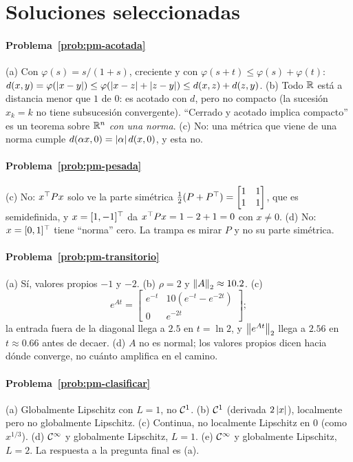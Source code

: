 \section{Soluciones seleccionadas}

\paragraph{Problema~\ref{prob:pm-acotada}}
(a) Con $\varphi(s)=s/(1+s)$, creciente y con $\varphi(s+t)\le\varphi(s)+\varphi(t)$: $d(x,y)=\varphi(\left\lvert x-y\right\rvert)\le\varphi(\left\lvert x-z\right\rvert+\left\lvert z-y\right\rvert)\le d(x,z)+d(z,y)$. (b) Todo $\mathbb{R}$ está a distancia menor que $1$ de $0$: es acotado con $d$, pero no compacto (la sucesión $x_k=k$ no tiene subsucesión convergente). ``Cerrado y acotado implica compacto'' es un teorema sobre $\mathbb{R}^n$ \emph{con una norma}. (c) No: una métrica que viene de una norma cumple $d(\alpha x,0)=\left\lvert \alpha\right\rvert d(x,0)$, y esta no.

\paragraph{Problema~\ref{prob:pm-pesada}}
(c) No: $x^{\top} Px$ solo ve la parte simétrica $\tfrac12(P+P^{\top})=\begin{bmatrix}1&1\\1&1\end{bmatrix}$, que es semidefinida, y $x=[1,-1]^{\top}$ da $x^{\top} Px=1-2+1=0$ con $x\neq0$. (d) No: $x=[0,1]^{\top}$ tiene ``norma'' cero. La trampa es mirar $P$ y no su parte simétrica.

\paragraph{Problema~\ref{prob:pm-transitorio}}
(a) Sí, valores propios $-1$ y $-2$. (b) $\rho=2$ y $\left\lVert A\right\rVert_2\approx10.2$. (c) \[ e^{At}=\begin{bmatrix}e^{-t}&10(e^{-t}-e^{-2t})\\0&e^{-2t}\end{bmatrix}; \] la entrada fuera de la diagonal llega a $2.5$ en $t=\ln2$, y $\left\lVert e^{At}\right\rVert_2$ llega a $2.56$ en $t\approx0.66$ antes de decaer. (d) $A$ no es normal; los valores propios dicen hacia dónde converge, no cuánto amplifica en el camino.

\paragraph{Problema~\ref{prob:pm-clasificar}}
(a) Globalmente Lipschitz con $L=1$, no $\mathcal{C}^{1}$. (b) $\mathcal{C}^{1}$ (derivada $2\left\lvert x\right\rvert$), localmente pero no globalmente Lipschitz. (c) Continua, no localmente Lipschitz en $0$ (como $x^{1/3}$). (d) $\mathcal{C}^{\infty}$ y globalmente Lipschitz, $L=1$. (e) $\mathcal{C}^{\infty}$ y globalmente Lipschitz, $L=2$. La respuesta a la pregunta final es (a).

